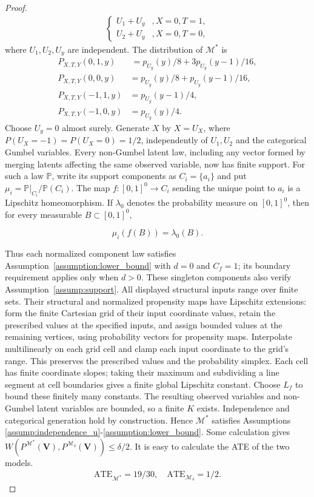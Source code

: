 \begin{proof}
\begin{align*}
\begin{cases}
U_{1} +U_{y} & ,X=0,T=1,\\
U_{2} +U_{y} & ,X=0,T=0,
\end{cases}
\end{align*}
where $ U_1,U_2,U_y $ are independent. The distribution of $ \mathcal{M}^*$ is 
\begin{align*}
P_{X,T,Y}( 0,1,y) & \ =p_{U_{y}}( y) /8+3p_{U_{y}}( y-1) /16,\\
P_{X,T,Y}( 0,0,y) & =p_{U_{y}}( y) /8+p_{U_{y}}( y-1) /16,\\
P_{X,T,Y}( -1,1,y) & =p_{U_{y}}( y-1) /4,\\
P_{X,T,Y}( -1,0,y) & =p_{U_{y}}( y) /4.
\end{align*}
Choose $U_y=0$ almost surely. Generate $X$ by $X=U_X$, where $P(U_X=-1)=P(U_X=0)=1/2$, independently of $U_1,U_2$ and the categorical Gumbel variables. Every non-Gumbel latent law, including any vector formed by merging latents affecting the same observed variable, now has finite support. For such a law $\mathbb P$, write its support components as $C_i=\{a_i\}$ and put $\mu_i=\mathbb P|_{C_i}/\mathbb P(C_i)$. The map $f:[0,1]^0\rightarrow C_i$ sending the unique point to $a_i$ is a Lipschitz homeomorphism. If $\lambda_0$ denotes the probability measure on $[0,1]^0$, then for every measurable $B\subset[0,1]^0$,

\[
\mu_i(f(B))=\lambda_0(B).
\]

Thus each normalized component law satisfies Assumption~\ref{assumption:lower_bound} with $d=0$ and $C_f=1$; its boundary requirement applies only when $d>0$. These singleton components also verify Assumption~\ref{assump:support}. All displayed structural inputs range over finite sets. Their structural and normalized propensity maps have Lipschitz extensions: form the finite Cartesian grid of their input coordinate values, retain the prescribed values at the specified inputs, and assign bounded values at the remaining vertices, using probability vectors for propensity maps. Interpolate multilinearly on each grid cell and clamp each input coordinate to the grid's range. This preserves the prescribed values and the probability simplex. Each cell has finite coordinate slopes; taking their maximum and subdividing a line segment at cell boundaries gives a finite global Lipschitz constant. Choose $L_f$ to bound these finitely many constants. The resulting observed variables and non-Gumbel latent variables are bounded, so a finite $K$ exists. Independence and categorical generation hold by construction. Hence $\mathcal M^*$ satisfies Assumptions \ref{assump:independence_u}-\ref{assumption:lower_bound}. Some calculation gives $ W( P^{\mathcal{M}^*}(\boldsymbol{V}) ,P^{\mathcal{M}_{\delta }}(\boldsymbol{V})) \leqslant \delta /2$. It is easy to calculate the ATE of the two models. 
\begin{align*}
\text{ATE}_{\mathcal{M}^*} = 19/30, & \ \text{ATE}_{\mathcal{M}_{\delta }} = 1/2.
\end{align*}
\end{proof}
